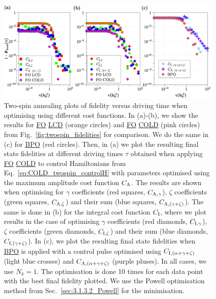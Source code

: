 \documentclass[a4paper,oneside,11pt]{book}
\newcommand{\acrref}[1]{\hyperref[acr:#1]{#1}}
\begin{document}
\begin{figure}[t]
    \centering
    \includegraphics[width=\linewidth]{images/twospin_HO_scatter.png} \caption[Two-spin annealing plots of fidelity versus driving time when minimising different orders of LCD.]{Two-spin annealing plots of fidelity versus driving time when optimising using different cost functions. In (a)-(b), we show the results for \acrref{FO} \acrref{LCD} (orange circles) and \acrref{FO} \acrref{COLD} (pink circles) from Fig.~\ref{fig:twospin_fidelities} for comparison. We do the same in (c) for \acrref{BPO} (red circles). Then, in (a) we plot the resulting final state fidelities at different driving times $\tau$ obtained when applying \acrref{FO} \acrref{COLD} to control Hamiltonians from Eq.~\eqref{eq:COLD_twospin_controlH} with parameters optimised using the maximum amplitude cost function $C_{\rm A}$. The results are shown when optimising for $\gamma$ coefficients (red squares, $C_{\rm A, \gamma}$), $\zeta$ coefficients (green squares, $C_{\rm A, \zeta}$) and their sum (blue squares, $C_{\rm A, (\gamma + \zeta)}$). The same is done in (b) for the integral cost function $C_{\rm I}$, where we plot results in the case of optimising $\gamma$ coefficients (red diamonds, $C_{\rm I, \gamma}$), $\zeta$ coefficients (green diamonds, $C_{\rm I, \zeta}$) and their sum (blue diamonds, $C_{\rm I, (\gamma + \zeta)}$). In (c), we plot the resulting final state fidelities when \acrref{BPO} is applied with a control pulse optimised using $C_{\rm I, (\alpha + \gamma + \zeta)}$ (light blue crosses) and $C_{\rm A, (\alpha + \gamma + \zeta)}$ (purple pluses). In all cases, we use $N_k = 1$. The optimisation is done 10 times for each data point with the best final fidelity plotted. We use the Powell optimisation method from Sec.~\ref{sec:3.1.3.2_Powell} for the minimisation.}\label{fig:twospin_scatter}
\end{figure}
\end{document}

